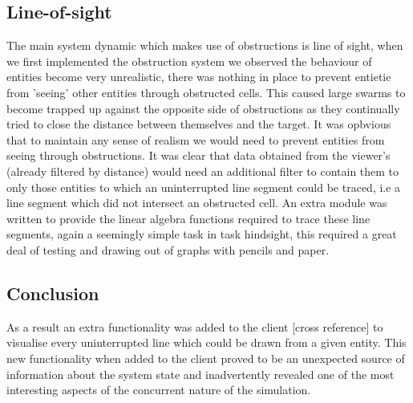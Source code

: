 \subsection{Line-of-sight}
The main system dynamic which makes use of obstructions is line of sight, when we first implemented the obstruction system we observed the behaviour of entities become very unrealistic, there was nothing in place to prevent entietie from 'seeing' other entities through obstructed cells. This caused large swarms to become trapped up against the opposite side of obstructions as they continually tried to close the distance between themselves and the target. It was opbvious that to maintain any sense of realism we would need to prevent entities from seeing through obstructions.
It was clear that data obtained from the viewer's (already filtered by distance) would need an additional filter to contain them to only those entities to which an uninterrupted line segment could be traced, i.e a line segment which did not intersect an obstructed cell. An extra module was written to provide the linear algebra functions required to trace these line segments, again a seemingly simple task in task hindsight, this required a great deal of testing and drawing out of graphs with pencils and paper.
\subsection{Conclusion}
As a result an extra functionality was added to the client [cross reference] to visualise every uninterrupted line which could be drawn from a given entity. This new functionality when added to the client proved to be an unexpected source of information about the system state and inadvertently revealed one of the most interesting aspects of the concurrent nature of the simulation.
